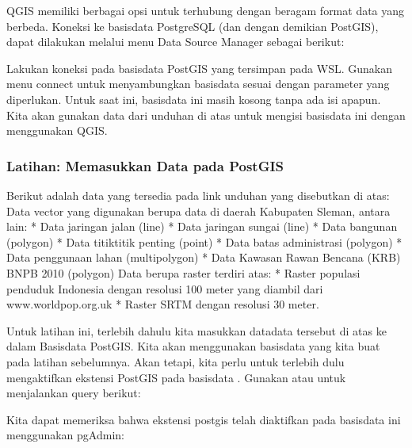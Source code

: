 \documentclass[letterpaper,10pt,english]{sphinxmanual}
\begin{document}
QGIS memiliki berbagai opsi untuk terhubung dengan beragam format data yang berbeda. Koneksi ke basisdata PostgreSQL (dan dengan demikian PostGIS), dapat dilakukan melalui menu Data Source Manager sebagai berikut:


Lakukan koneksi pada basisdata PostGIS yang tersimpan pada WSL. Gunakan menu connect untuk menyambungkan basisdata sesuai dengan parameter yang diperlukan. Untuk saat ini, basisdata ini masih kosong tanpa ada isi apapun. Kita akan gunakan data dari unduhan di atas untuk mengisi basisdata ini dengan menggunakan QGIS.


\subsubsection{Latihan: Memasukkan Data pada PostGIS}
\label{\detokenize{sesi2/postgisquery:latihan-memasukkan-data-pada-postgis}}
Berikut adalah data yang tersedia pada link unduhan yang disebutkan di atas:
Data vector yang digunakan berupa data di daerah Kabupaten Sleman, antara lain:
*	Data jaringan jalan (line)
*	Data jaringan sungai (line)
*	Data bangunan (polygon)
*	Data titik\sphinxhyphen{}titik penting (point)
*	Data batas administrasi (polygon)
*	Data penggunaan lahan (multipolygon)
*	Data Kawasan Rawan Bencana (KRB) BNPB 2010 (polygon)
Data berupa raster terdiri atas:
*	Raster populasi penduduk Indonesia dengan resolusi 100 meter yang diambil dari www.worldpop.org.uk
*	Raster SRTM dengan resolusi 30 meter.

Untuk latihan ini, terlebih dahulu kita masukkan data\sphinxhyphen{}data tersebut di atas ke dalam Basisdata PostGIS. Kita akan menggunakan basisdata  yang kita buat pada latihan sebelumnya. Akan tetapi, kita perlu untuk terlebih dulu mengaktifkan ekstensi PostGIS pada basisdata . Gunakan  atau  untuk menjalankan query berikut:

\begin{sphinxVerbatim}[commandchars=\\\{\}]
  
\end{sphinxVerbatim}

Kita dapat memeriksa bahwa ekstensi postgis telah diaktifkan pada basisdata ini menggunakan pgAdmin:

\end{document}
